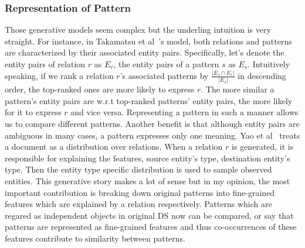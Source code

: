 \documentclass[10pt]{article} %
\theoremstyle{definition}
\theoremstyle{definition}
\begin{document}
\subsubsection{Representation of Pattern}
Those generative models seem complex but the underling intuition is very straight. 
For instance, in Takamatsu et al~\cite{takagenerative}'s model, both relations and patterns are characterized by their associated entity pairs. 
Specifically, let's denote the entity pairs of relation $r$ as $E_r$, the entity pairs of a pattern $s$ as $E_s$. 
Intuitively speaking, if we rank a relation $r$'s associated patterns by $\frac{\vert E_s \cap E_r \vert}{\vert E_s \vert}$ in descending order, the top-ranked ones are more likely to express $r$. 
The more similar a pattern's entity pairs are w.r.t top-ranked patterns' entity pairs, the more likely for it to express $r$ and vice versa. 
Representing a pattern in such a manner allows us to compare different patterns. 
Another benefit is that although entity pairs are ambiguous in many cases, a pattern expresses only one meaning. 
Yao et al~\cite{yaolda} treats a document as a distribution over relations. 
When a relation $r$ is generated, it is responsible for explaining the features, source entity's type, destination entity's type. 
Then the entity type specific distribution is used to sample observed entities. 
This generative story makes a lot of sense but in my opinion, the most important contribution is breaking down original patterns into fine-grained features which are explained by a relation respectively. 
Patterns which are regared as independent objects in original DS now can be compared, 
or say that patterns are represented as fine-grained features and thus co-occurrences of these features contribute to similarity between patterns. 
\end{document}

